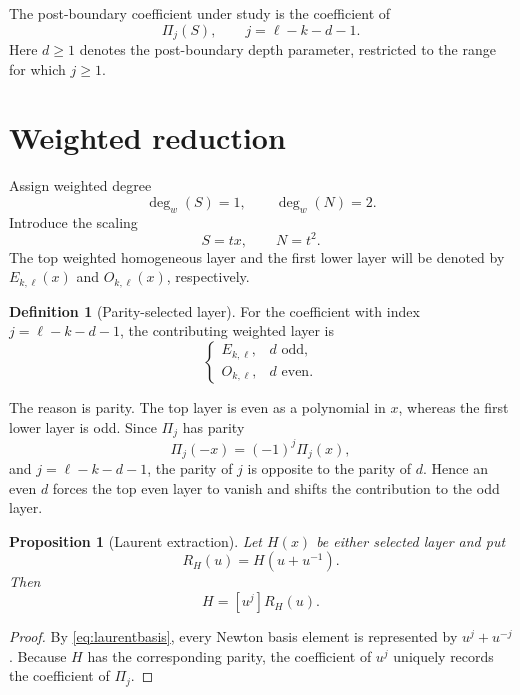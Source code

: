\documentclass[11pt]{article}
\newtheorem{proposition}[theorem]{Proposition}
\theoremstyle{remark}
\theoremstyle{definition}
\newtheorem{definition}[theorem]{Definition}
\newcommand{\N}{N}
\newcommand{\Ssym}{S}
\newcommand{\Ekl}{E_{k,\ell}}
\newcommand{\Okl}{O_{k,\ell}}
\begin{document}
The post-boundary coefficient under study is the coefficient of
\begin{equation}
\Pi_j(\Ssym),
\qquad
\boxed{j=\ell-k-d-1}.
\label{eq:jindex}
\end{equation}
Here $d\ge 1$ denotes the post-boundary depth parameter, restricted to the
range for which $j\ge1$.

\section{Weighted reduction}

Assign weighted degree
\[
\deg_w(\Ssym)=1,
\qquad
\deg_w(\N)=2.
\]
Introduce the scaling
\begin{equation}
\Ssym=tx,\qquad \N=t^2.
\label{eq:weightedscale}
\end{equation}
The top weighted homogeneous layer and the first lower layer will be denoted
by $\Ekl(x)$ and $\Okl(x)$, respectively.

\begin{definition}[Parity-selected layer]
For the coefficient with index $j=\ell-k-d-1$, the contributing weighted layer is
\[
\begin{cases}
\Ekl, & d\text{ odd},\\
\Okl, & d\text{ even}.
\end{cases}
\]
\end{definition}

The reason is parity.  The top layer is even as a polynomial in $x$, whereas
the first lower layer is odd.  Since $\Pi_j$ has parity
\begin{equation}
\Pi_j(-x)=(-1)^j\Pi_j(x),
\label{eq:parityPi}
\end{equation}
and $j=\ell-k-d-1$, the parity of $j$ is opposite to the parity of $d$.
Hence an even $d$ forces the top even layer to vanish and shifts the
contribution to the odd layer.

\begin{proposition}[Laurent extraction]
Let $H(x)$ be either selected layer and put
\[
R_H(u)=H(u+u^{-1}).
\]
Then
\begin{equation}
[\Pi_j]H=[u^j]R_H(u).
\label{eq:laurentextract}
\end{equation}
\end{proposition}

\begin{proof}
By \eqref{eq:laurentbasis}, every Newton basis element is represented by
$u^j+u^{-j}$.  Because $H$ has the corresponding parity, the coefficient of
$u^j$ uniquely records the coefficient of $\Pi_j$.
\end{proof}
\end{document}
